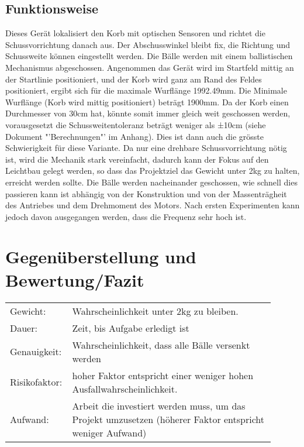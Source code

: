 \begin{landscape}
\subsection{Funktionsweise}
Dieses Gerät lokalisiert den Korb mit optischen Sensoren und richtet die Schussvorrichtung danach aus. Der Abschusswinkel bleibt fix, die Richtung und Schussweite können eingestellt werden. Die Bälle werden mit einem ballistischen Mechanismus abgeschossen. Angenommen das Gerät wird im Startfeld mittig an der Startlinie positioniert, und der Korb wird ganz am Rand des Feldes positioniert, ergibt sich für die maximale Wurflänge 1992.49mm. Die Minimale Wurflänge (Korb wird mittig positioniert) beträgt 1900mm. Da der Korb einen Durchmesser von 30cm hat, könnte somit immer gleich weit geschossen werden, vorausgesetzt die Schussweitentoleranz beträgt weniger als ±10cm (siehe Dokument "'Berechnungen"' im Anhang). Dies ist dann auch die grösste Schwierigkeit für diese Variante. Da nur eine drehbare Schussvorrichtung nötig ist, wird die Mechanik stark vereinfacht, dadurch kann der Fokus auf den Leichtbau gelegt werden, so dass das Projektziel das Gewicht unter 2kg zu halten, erreicht werden sollte. Die Bälle werden nacheinander geschossen, wie schnell dies passieren kann ist abhängig von der Konstruktion und von der Massenträgheit des Antriebes und dem Drehmoment des Motors. Nach ersten Experimenten kann jedoch davon ausgegangen werden, dass die Frequenz sehr hoch ist.

\clearpage



\clearpage

\end{landscape}

\section{Gegenüberstellung und Bewertung/Fazit}
\begin{tabular}{@{}p{0.15\linewidth}p{0.75\linewidth}}
    Gewicht:        & Wahrscheinlichkeit unter 2kg zu bleiben. \\
    Dauer:          & Zeit, bis Aufgabe erledigt ist \\
    Genauigkeit:    & Wahrscheinlichkeit, dass alle Bälle versenkt werden \\
    Risikofaktor:   & hoher Faktor entspricht einer weniger hohen Ausfallwahrscheinlichkeit. \\
    Aufwand:        & Arbeit die investiert werden muss, um das Projekt umzusetzen (höherer Faktor entspricht weniger Aufwand) \\
\end{tabular}

